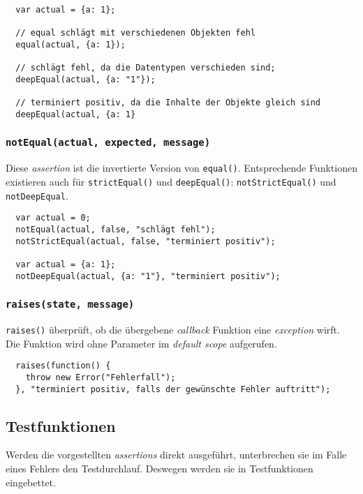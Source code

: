 \documentclass[11pt, a4paper]{article}
\begin{document}
\begin{verbatim}
  var actual = {a: 1};

  // equal schlägt mit verschiedenen Objekten fehl
  equal(actual, {a: 1});

  // schlägt fehl, da die Datentypen verschieden sind;
  deepEqual(actual, {a: "1"});

  // terminiert positiv, da die Inhalte der Objekte gleich sind
  deepEqual(actual, {a: 1}
\end{verbatim}

\subsubsection*{\texttt{notEqual(actual, expected, message)}}

Diese \emph{assertion} ist die invertierte Version von \texttt{equal()}.
Entsprechende Funktionen existieren auch für \texttt{strictEqual()} und
\texttt{deepEqual()}: \texttt{notStrictEqual()} und \texttt{notDeepEqual}.

\begin{verbatim}
  var actual = 0;
  notEqual(actual, false, "schlägt fehl");
  notStrictEqual(actual, false, "terminiert positiv");

  var actual = {a: 1};
  notDeepEqual(actual, {a: "1"}, "terminiert positiv");
\end{verbatim}

\subsubsection*{\texttt{raises(state, message)}}

\texttt{raises()} überprüft, ob die übergebene \emph{callback} Funktion eine
\emph{exception} wirft. Die Funktion wird ohne Parameter im \emph{default scope}
aufgerufen.

\begin{verbatim}
  raises(function() {
    throw new Error("Fehlerfall");
  }, "terminiert positiv, falls der gewünschte Fehler auftritt");
\end{verbatim}

\subsection{Testfunktionen}

Werden die vorgestellten \emph{assertions} direkt ausgeführt, unterbrechen sie
im Falle eines Fehlers den Testdurchlauf. Deswegen werden sie in Testfunktionen
eingebettet.
\end{document}
